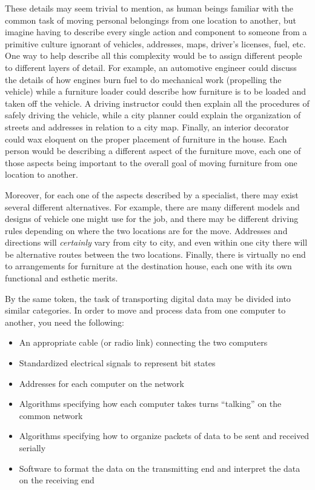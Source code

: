 These details may seem trivial to mention, as human beings familiar with the common task of moving personal belongings from one location to another, but imagine having to describe every single action and component to someone from a primitive culture ignorant of vehicles, addresses, maps, driver's licenses, fuel, etc.  One way to help describe all this complexity would be to assign different people to different layers of detail.  For example, an automotive engineer could discuss the details of how engines burn fuel to do mechanical work (propelling the vehicle) while a furniture loader could describe how furniture is to be loaded and taken off the vehicle.  A driving instructor could then explain all the procedures of safely driving the vehicle, while a city planner could explain the organization of streets and addresses in relation to a city map.  Finally, an interior decorator could wax eloquent on the proper placement of furniture in the house.  Each person would be describing a different aspect of the furniture move, each one of those aspects being important to the overall goal of moving furniture from one location to another.

Moreover, for each one of the aspects described by a specialist, there may exist several different alternatives.  For example, there are many different models and designs of vehicle one might use for the job, and there may be different driving rules depending on where the two locations are for the move.  Addresses and directions will \textit{certainly} vary from city to city, and even within one city there will be alternative routes between the two locations.  Finally, there is virtually no end to arrangements for furniture at the destination house, each one with its own functional and esthetic merits.

\vskip 10pt

\filbreak

By the same token, the task of transporting digital data may be divided into similar categories.  In order to move and process data from one computer to another, you need the following:

\begin{itemize}
\item An appropriate cable (or radio link) connecting the two computers
\item Standardized electrical signals to represent bit states
\item Addresses for each computer on the network
\item Algorithms specifying how each computer takes turns ``talking'' on the common network
\item Algorithms specifying how to organize packets of data to be sent and received serially
\item Software to format the data on the transmitting end and interpret the data on the receiving end
\end{itemize}

